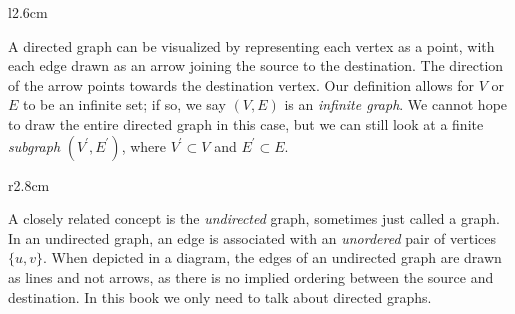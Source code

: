 \documentclass[../generics]{subfiles}
\begin{document}
\begin{wrapfigure}{l}{2.6cm}
\end{wrapfigure}
\noindent
A directed graph can be visualized by representing each vertex as a point, with each edge drawn as an arrow joining the source to the destination. The direction of the arrow points towards the destination vertex. Our definition allows for $V$ or $E$ to be an infinite set; if so, we say $(V, E)$ is an \emph{infinite graph}. We cannot hope to draw the entire directed graph in this case, but we can still look at a finite \emph{subgraph} $(V^\prime, E^\prime)$, where $V^\prime\subset V$ and $E^\prime\subset E$.


\begin{wrapfigure}{r}{2.8cm}
\end{wrapfigure}
A closely related concept is the \emph{undirected} graph, sometimes just called a graph. In an undirected graph, an edge is associated with an \emph{unordered} pair of vertices $\{u,v\}$. When depicted in a diagram, the edges of an undirected graph are drawn as lines and not arrows, as there is no implied ordering between the source and destination. In this book we only need to talk about directed graphs.
\end{document}
